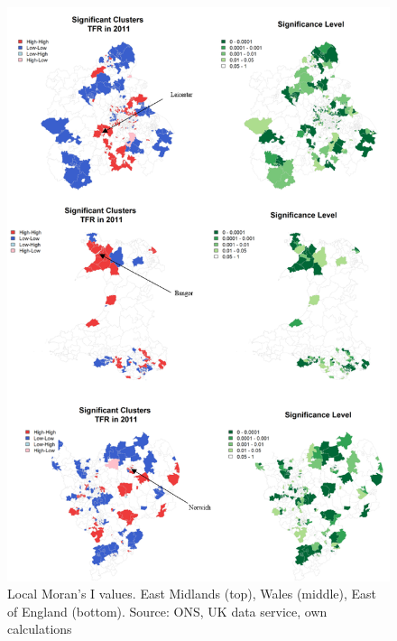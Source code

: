 \documentclass[12pt,twoside]{reedthesis}
\begin{document}
\begin{figure}
\includegraphics[width=0.95\linewidth]{figure/Figure_11} \caption{Local Moran's I values. East Midlands (top), Wales (middle), East of England (bottom). Source: ONS, UK data service, own calculations}\label{fig:figure11}
\end{figure}
\end{document}
